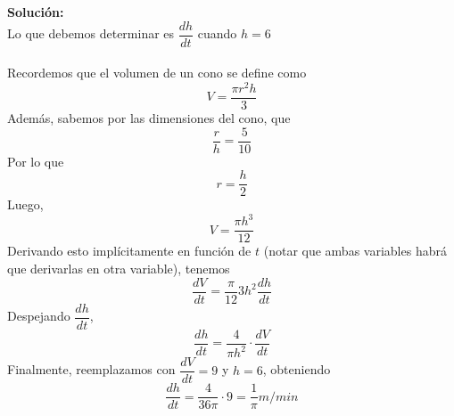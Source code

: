 \documentclass[12pt]{article}
\newenvironment{solucion}
{\begin{mdframed}[backgroundcolor=black!10]
		{\bf Solución:}\\
	}
	{
	\end{mdframed}
}
\newenvironment{preguntas}
{\begin{enumerate}\itemsep12pt
	}
	{
	\end{enumerate}
}
\begin{document}
\begin{preguntas}
\begin{solucion}
Lo que debemos determinar es $\dfrac{dh}{dt}$ cuando $h=6$\\
\\
Recordemos que el volumen de un cono se define como
$$V = \dfrac{\pi r^2 h}{3}$$
Además, sabemos por las dimensiones del cono, que
$$\dfrac{r}{h} = \dfrac{5}{10}$$
Por lo que 
$$r = \dfrac{h}{2}$$
Luego,
$$V = \dfrac{\pi h^3}{12}$$
Derivando esto implícitamente en función de $t$ (notar que ambas variables habrá que derivarlas en otra variable), tenemos
$$\dfrac{dV}{dt} = \dfrac{\pi}{12}3h^2\dfrac{dh}{dt}$$
Despejando $\dfrac{dh}{dt}$,
$$\dfrac{dh}{dt} = \dfrac{4}{\pi h^2} \cdot \dfrac{dV}{dt}$$
Finalmente, reemplazamos con $\dfrac{dV}{dt} = 9$ y $h = 6$, obteniendo
$$\dfrac{dh}{dt} = \dfrac{4}{36\pi}\cdot 9 = \dfrac{1}{\pi} m/min$$
\end{solucion}
\end{preguntas}
\end{document}
